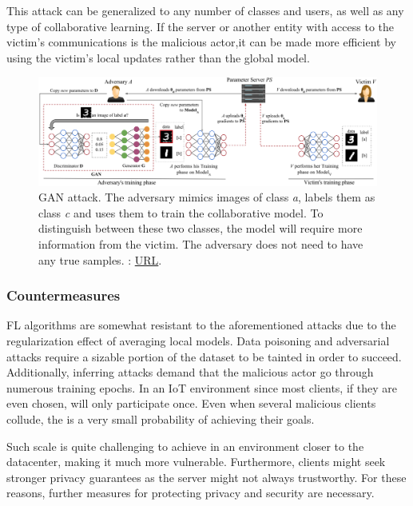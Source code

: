 \begin{itemize}
  This attack can be generalized to any number of classes and users, as well as any type of collaborative learning. If the server or another entity with access to the victim's communications is the malicious actor,it can be made more efficient by using the victim's local updates rather than the global model.
\end{itemize}

\begin{figure}[H]
    \centering
        \includegraphics[width=1\textwidth]{Images/topologies/gan_fl.png}
        \decoRule
        \caption[GAN attack]{GAN attack. The adversary mimics images of class \emph{a}, labels them as class \emph{c} and uses them to train the collaborative model. To distinguish between these two classes, the model will require more information from the victim. The adversary does not need to have any true samples. \cite{GAN_attack}: \href{https://arxiv.org/abs/1702.07464}{URL}.}
        \label{fig:GAN attack}
\end{figure}

\subsubsection{Countermeasures}
FL algorithms are somewhat resistant to the aforementioned attacks due to the regularization effect of averaging local models. Data poisoning and adversarial attacks require a sizable portion of the dataset to be tainted in order to succeed. Additionally, inferring attacks demand that the malicious actor go through numerous training epochs. In an IoT environment since most clients, if they are even chosen, will only participate once. Even when several malicious clients collude, the is a very small probability of achieving their goals.

Such scale is quite challenging to achieve in an environment closer to the datacenter, making it much more vulnerable. Furthermore, clients might seek stronger privacy guarantees as the server might not always trustworthy. For these reasons, further measures for protecting privacy and security are necessary.

